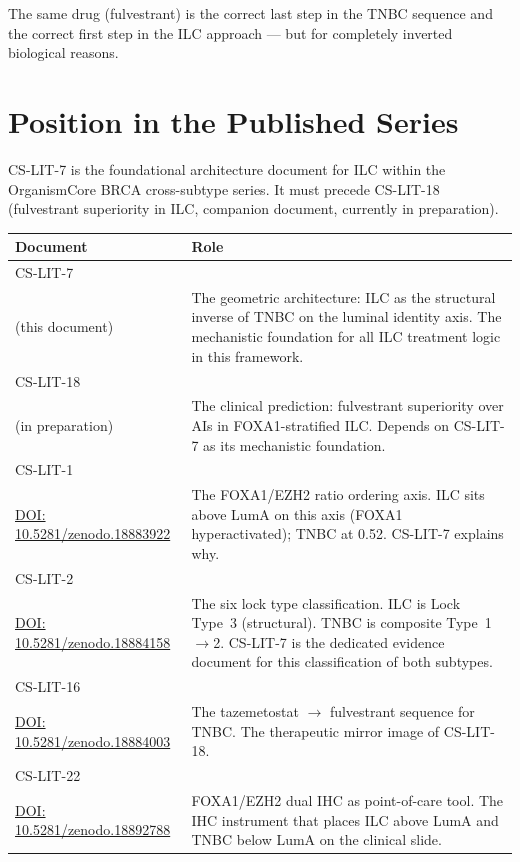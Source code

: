 \documentclass[12pt, a4paper]{article}
\begin{document}
The same drug (fulvestrant) is the correct
last step in the TNBC sequence and the correct
first step in the ILC approach --- but for
completely inverted biological reasons.

\section{Position in the Published Series}

CS-LIT-7 is the foundational architecture
document for ILC within the OrganismCore BRCA
cross-subtype series. It must precede CS-LIT-18
(fulvestrant superiority in ILC, companion
document, currently in preparation).

\begin{center}
\begin{tabular}{p{2.8cm}p{8.5cm}}
\toprule
\textbf{Document} & \textbf{Role} \\
\midrule
CS-LIT-7\\(this document) &
The geometric architecture: ILC as the structural
inverse of TNBC on the luminal identity axis.
The mechanistic foundation for all ILC treatment
logic in this framework. \\[0.5em]
CS-LIT-18\\(in preparation) &
The clinical prediction: fulvestrant superiority
over AIs in FOXA1-stratified ILC. Depends on
CS-LIT-7 as its mechanistic foundation. \\[0.5em]
CS-LIT-1\\
\href{https://doi.org/10.5281/zenodo.18883922}
{DOI: 10.5281/zenodo.18883922} &
The FOXA1/EZH2 ratio ordering axis. ILC sits
above LumA on this axis (FOXA1 hyperactivated);
TNBC at 0.52. CS-LIT-7 explains why. \\[0.5em]
CS-LIT-2\\
\href{https://doi.org/10.5281/zenodo.18884158}
{DOI: 10.5281/zenodo.18884158} &
The six lock type classification. ILC is Lock
Type~3 (structural). TNBC is composite
Type~1$\rightarrow$2. CS-LIT-7 is the
dedicated evidence document for this
classification of both subtypes. \\[0.5em]
CS-LIT-16\\
\href{https://doi.org/10.5281/zenodo.18884003}
{DOI: 10.5281/zenodo.18884003} &
The tazemetostat $\rightarrow$ fulvestrant
sequence for TNBC. The therapeutic mirror
image of CS-LIT-18. \\[0.5em]
CS-LIT-22\\
\href{https://doi.org/10.5281/zenodo.18892788}
{DOI: 10.5281/zenodo.18892788} &
FOXA1/EZH2 dual IHC as point-of-care tool.
The IHC instrument that places ILC above LumA
and TNBC below LumA on the clinical slide. \\
\bottomrule
\end{tabular}
\end{center}
\end{document}
